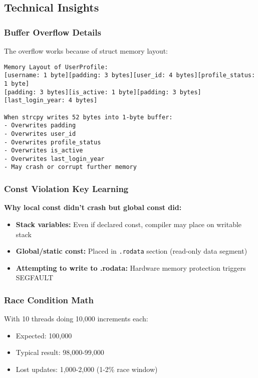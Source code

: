 \documentclass[11pt,a4paper]{article}
\begin{document}
\subsection{Technical Insights}

\subsubsection{Buffer Overflow Details}

The overflow works because of struct memory layout:

\begin{verbatim}
Memory Layout of UserProfile:
[username: 1 byte][padding: 3 bytes][user_id: 4 bytes][profile_status: 1 byte]
[padding: 3 bytes][is_active: 1 byte][padding: 3 bytes][last_login_year: 4 bytes]

When strcpy writes 52 bytes into 1-byte buffer:
- Overwrites padding
- Overwrites user_id
- Overwrites profile_status
- Overwrites is_active
- Overwrites last_login_year
- May crash or corrupt further memory
\end{verbatim}

\subsubsection{Const Violation Key Learning}

\textbf{Why local const didn't crash but global const did:}
\begin{itemize}
    \item \textbf{Stack variables:} Even if declared const, compiler may place on writable stack
    \item \textbf{Global/static const:} Placed in \texttt{.rodata} section (read-only data segment)
    \item \textbf{Attempting to write to .rodata:} Hardware memory protection triggers SEGFAULT
\end{itemize}

\subsubsection{Race Condition Math}

With 10 threads doing 10,000 increments each:
\begin{itemize}
    \item Expected: 100,000
    \item Typical result: 98,000-99,000
    \item Lost updates: 1,000-2,000 (1-2\% race window)
\end{itemize}
\end{document}
